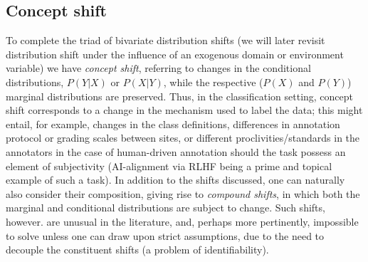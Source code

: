 \subsection{Concept shift}\label{ssec:concept-shift}
To complete the triad of bivariate distribution shifts (we will later revisit distribution shift
under the influence of an exogenous domain or environment variable) we have \emph{concept shift},
referring to changes in the conditional distributions, \( P(Y|X) \) or \( P(X|Y) \), while the
respective (\( P(X) \) and \( P(Y) \)) marginal distributions are preserved.
%
Thus, in the classification setting, concept shift corresponds to a change in the mechanism used to
label the data; this might entail, for example, changes in the class definitions, differences in
annotation protocol or grading scales between sites,  or different proclivities/standards in the
annotators in the case of human-driven annotation should the task possess an element of
subjectivity (AI-alignment via RLHF \citep{bai2022training} being a prime and topical example of
such a task).
%
In addition to the shifts discussed, one can naturally also consider their composition, giving rise
to \emph{compound shifts}, in which both the marginal and conditional distributions are subject to
change. Such shifts, however. are unusual in the literature, and, perhaps more pertinently,
impossible to solve unless one can draw upon strict assumptions, due to the need to decouple the
constituent shifts (a problem of identifiability).
%

